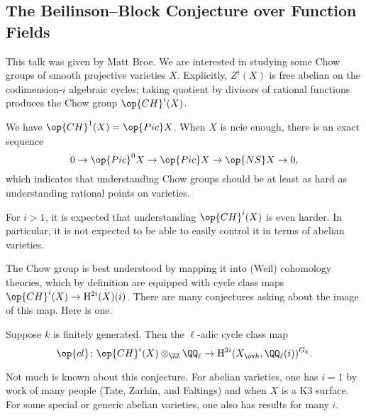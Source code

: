 \documentclass{article}
\begin{document}
\subsection{The Beilinson--Block Conjecture over Function Fields}
This talk was given by Matt Broe. We are interested in studying some Chow groups of smooth projective varieties $X$. Explicitly, $Z^i(X)$ is free abelian on the codimension-$i$ algebraic cycles; taking quotient by divisors of rational functions produces the Chow group $\op{CH}^i(X)$.
\begin{example}
	We have $\op{CH}^1(X)=\op{Pic}X$. When $X$ is ncie enough, there is an exact sequence
	\[0\to\op{Pic}^0X\to\op{Pic}X\to\op{NS}X\to0,\]
	which indicates that understanding Chow groups should be at least as hard as understanding rational points on varieties.
\end{example}
\begin{remark}
	For $i>1$, it is expected that understanding $\op{CH}^i(X)$ is even harder. In particular, it is not expected to be able to easily control it in terms of abelian varieties.
\end{remark}
The Chow group is best understood by mapping it into (Weil) cohomology theories, which by definition are equipped with cycle class maps $\op{CH}^i(X)\to\mathrm H^{2i}(X)(i)$. There are many conjectures asking about the image of this map. Here is one.
\begin{conj}[Tate]
	Suppose $k$ is finitely generated. Then the $\ell$-adic cycle class map
	\[\op{cl}\colon\op{CH}^i(X)\otimes_\ZZ\QQ_\ell\to\mathrm H^{2i}(X_{\ov k},\QQ_\ell(i))^{G_k}.\]
\end{conj}
Not much is known about this conjecture. For abelian varieties, one has $i=1$ by work of many people (Tate, Zarhin, and Faltings) and when $X$ is a K3 surface. For some special or generic abelian varieties, one also has results for many $i$.
\end{document}
